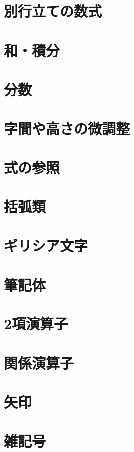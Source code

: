 \documentclass{jsbook}
\begin{document}
\section{別行立ての数式}

\section{和・積分}

\section{分数}

\section{字間や高さの微調整}

\section{式の参照}

\section{括弧類}

\section{ギリシア文字}

\section{筆記体}

\section{2項演算子}

\section{関係演算子}

\section{矢印}

\section{雑記号}
\end{document}
